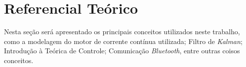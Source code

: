 \chapter[Referencial Teórico]{Referencial Teórico}
\label{ch:referencial_teorico}

Nesta seção será apresentado os principais conceitos utilizados neste trabalho, como a modelagem do motor de corrente contínua utilizada; Filtro de \emph{Kalman}; Introdução à Teórica de Controle; Comunicação \emph{Bluetooth}, entre outras coisos conceitos.







